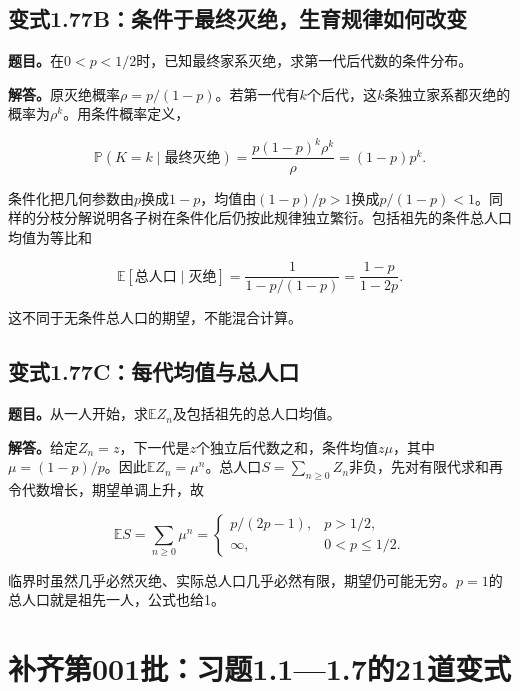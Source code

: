 \documentclass[
  11pt,a4paper,UTF8,fontset=fandol]{ctexart}
\begin{document}
\subsection{变式1.77B：条件于最终灭绝，生育规律如何改变}\label{ux53d8ux5f0f1.77bux6761ux4ef6ux4e8eux6700ux7ec8ux706dux7eddux751fux80b2ux89c4ux5f8bux5982ux4f55ux6539ux53d8}

\textbf{题目。}在\(0<p<1/2\)时，已知最终家系灭绝，求第一代后代数的条件分布。

\textbf{解答。}原灭绝概率\(\rho=p/(1-p)\)。若第一代有\(k\)个后代，这\(k\)条独立家系都灭绝的概率为\(\rho^k\)。用条件概率定义，

\[\mathbb P(K=k\mid\text{最终灭绝})
=\frac{p(1-p)^k\rho^k}{\rho}
=\boxed{(1-p)p^k}.\]

条件化把几何参数由\(p\)换成\(1-p\)，均值由\((1-p)/p>1\)换成\(p/(1-p)<1\)。同样的分枝分解说明各子树在条件化后仍按此规律独立繁衍。包括祖先的条件总人口均值为等比和

\[\boxed{\mathbb E[\text{总人口}\mid\text{灭绝}]=\frac1{1-p/(1-p)}=\frac{1-p}{1-2p}.}\]

这不同于无条件总人口的期望，不能混合计算。

\subsection{变式1.77C：每代均值与总人口}\label{ux53d8ux5f0f1.77cux6bcfux4ee3ux5747ux503cux4e0eux603bux4ebaux53e3}

\textbf{题目。}从一人开始，求\(\mathbb EZ_n\)及包括祖先的总人口均值。

\textbf{解答。}给定\(Z_n=z\)，下一代是\(z\)个独立后代数之和，条件均值\(z\mu\)，其中\(\mu=(1-p)/p\)。因此\(\mathbb EZ_n=\mu^n\)。总人口\(S=\sum_{n\ge0}Z_n\)非负，先对有限代求和再令代数增长，期望单调上升，故

\[\boxed{\mathbb ES=\sum_{n\ge0}\mu^n=
\begin{cases}
p/(2p-1),&p>1/2,\\
\infty,&0<p\le1/2.
\end{cases}}\]

临界时虽然几乎必然灭绝、实际总人口几乎必然有限，期望仍可能无穷。\(p=1\)的总人口就是祖先一人，公式也给1。

\section{补齐第001批：习题1.1---1.7的21道变式}\label{ux8865ux9f50ux7b2c001ux6279ux4e60ux98981.11.7ux768421ux9053ux53d8ux5f0f}
\end{document}
